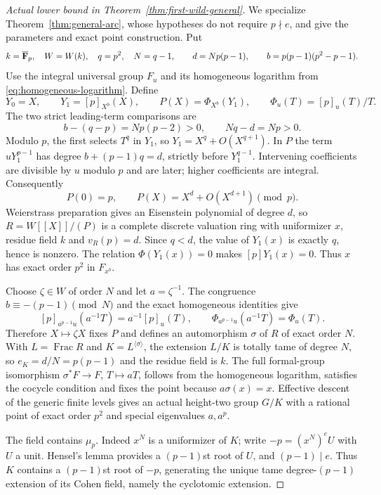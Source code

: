\begin{proof}[Actual lower bound in Theorem~\ref{thm:first-wild-general}]
We specialize Theorem~\ref{thm:general-arc}, whose hypotheses do not require $p\nmid e$, and give the parameters and exact point construction. Put
\[
 k=\overline{\mathbf F}_p,\quad W=W(k),\quad q=p^2,\quad N=q-1,
 \qquad d=Np(p-1),\qquad b=p(p-1)(p^2-p-1).
\]
Use the integral universal group $F_u$ and its homogeneous logarithm from \eqref{eq:homogeneous-logarithm}. Define
\[
 Y_0=X,\qquad Y_1=[p]_{X^b}(X),\qquad
 P(X)=\Phi_{X^b}(Y_1),\qquad \Phi_u(T)=[p]_u(T)/T.
\]
The two strict leading-term comparisons are
\[
 b-(q-p)=Np(p-2)>0,\qquad Nq-d=Np>0.
\]
Modulo $p$, the first selects $T^q$ in $Y_1$, so $Y_1=X^q+O(X^{q+1})$. In $P$ the term $uY_1^{p-1}$ has degree $b+(p-1)q=d$, strictly before $Y_1^{q-1}$. Intervening coefficients are divisible by $u$ modulo $p$ and are later; higher coefficients are integral. Consequently
\[
                     P(0)=p,\qquad P(X)=X^d+O(X^{d+1})\pmod p.
\]
Weierstrass preparation gives an Eisenstein polynomial of degree $d$, so $R=W[[X]]/(P)$ is a complete discrete valuation ring with uniformizer $x$, residue field $k$ and $v_R(p)=d$. Since $q<d$, the value of $Y_1(x)$ is exactly $q$, hence is nonzero. The relation $\Phi(Y_1(x))=0$ makes $[p]Y_1(x)=0$. Thus $x$ has exact order $p^2$ in $F_{x^b}$.

Choose $\zeta\in W$ of order $N$ and let $a=\zeta^{-1}$. The congruence $b\equiv-(p-1)\pmod N$ and the exact homogeneous identities give
\[
 [p]_{a^{p-1}u}(a^{-1}T)=a^{-1}[p]_u(T),\qquad
 \Phi_{a^{p-1}u}(a^{-1}T)=\Phi_u(T).
\]
Therefore $X\mapsto\zeta X$ fixes $P$ and defines an automorphism $\sigma$ of $R$ of exact order $N$. With $L=\operatorname{Frac}R$ and $K=L^{\langle\sigma\rangle}$, the extension $L/K$ is totally tame of degree $N$, so $e_K=d/N=p(p-1)$ and the residue field is $k$. The full formal-group isomorphism $\sigma^*F\to F$, $T\mapsto aT$, follows from the homogeneous logarithm, satisfies the cocycle condition and fixes the point because $a\sigma(x)=x$. Effective descent of the generic finite levels gives an actual height-two group $G/K$ with a rational point of exact order $p^2$ and special eigenvalues $a,a^p$.

The field contains $\mu_p$. Indeed $x^N$ is a uniformizer of $K$; write $-p=(x^N)^eU$ with $U$ a unit. Hensel's lemma provides a $(p-1)$st root of $U$, and $(p-1)\mid e$. Thus $K$ contains a $(p-1)$st root of $-p$, generating the unique tame degree-$(p-1)$ extension of its Cohen field, namely the cyclotomic extension.


\end{proof}
